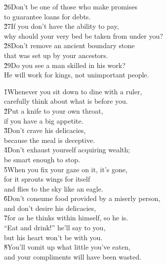 \begin{poetry}
\poeml \v{26}Don't be one of those who make promises \\
\poemll    to guarantee loans for debts. \\
\poeml \v{27}If you don't have the ability to pay, \\
\poemll    why should your very bed be taken from under you? \\
\poeml \v{28}Don't remove an ancient boundary stone \\
\poemll    that was set up by your ancestors. \\
\poeml \v{29}Do you see a man skilled in his work? \\
\poemll    He will work for kings, not unimportant people.
\end{poetry}

\begin{poetry}
\poeml {}
\v{1}Whenever you sit down to dine with a ruler, \\
\poeml carefully think about what is before you. \\
\poeml \v{2}Put a knife to your own throat, \\
\poemll    if you have a big appetite. \\
\poeml \v{3}Don't crave his delicacies, \\
\poemll    because the meal is deceptive. \\
\poeml \v{4}Don't exhaust yourself acquiring wealth; \\
\poemll    be smart enough to stop. \\
\poeml \v{5}When you fix your gaze on it, it's gone, \\
\poemll    for it sprouts wings for itself \\
\poemlll       and flies to the sky like an eagle. \\
\poeml \v{6}Don't consume food provided by a miserly person, \\
\poemll    and don't desire his delicacies, \\
\poeml \v{7}for as he thinks within himself, so he is. \\
\poemll    ``Eat and drink!'' he'll say to you, \\
\poemlll       but his heart won't be with you. \\
\poeml \v{8}You'll vomit up what little you've eaten, \\
\poemll    and your compliments will have been wasted. \\

\end{poetry}
